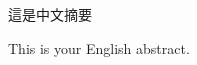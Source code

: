 \begin{abstractzh}
這是中文摘要
\end{abstractzh}

\begin{abstracten}
This is your English abstract.
\cleardoublepage
\end{abstracten}
\cleardoublepage